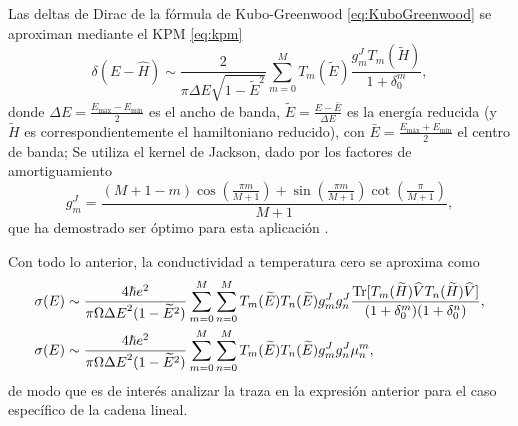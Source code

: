 Las deltas de Dirac de la fórmula de Kubo-Greenwood \eqref{eq:KuboGreenwood} se aproximan mediante el KPM \eqref{eq:kpm}
\begin{equation}\label{eq:diracDeltaKPM}
	\delta(E - \widehat{H}) \sim \frac{2}{\pi \Delta E \sqrt{1 - \widetilde{E}^2}} \sum_{m=0}^{M} T_m(\widetilde{E}) \frac{g^J_m T_m(\widetilde{H})}{1 + \delta^m_0},
\end{equation}
donde 
	$\Delta E = \frac{E_{\mathrm{máx}} - E_{\mathrm{mín}}}{2}$
es el ancho de banda, 
	$\widetilde{E} = \frac{E - \bar{E}}{\Delta E}$ 
es la energía reducida (y $\widetilde{H}$ es correspondientemente el hamiltoniano reducido), con $\bar{E} = \frac{E_{\mathrm{máx}} + E_{\mathrm{mín}}}{2}$ el centro de banda;
Se utiliza el kernel de Jackson, dado por los factores de amortiguamiento
\begin{equation}\label{eq:jacksonKernel}
	g_m^J = \frac{(M + 1 - m)\cos(\frac{\pi m}{M + 1}) + \sin(\frac{\pi m}{M + 1})\cot(\frac{\pi}{M + 1})}{M + 1},
\end{equation}
que ha demostrado ser óptimo para esta aplicación \autocite{Weise2006}.

Con todo lo anterior, la conductividad a temperatura cero se aproxima como
\begin{equation}\label{eq:KGapprox}
	\begin{aligned}
		\sigma(E) &\sim \frac{4\hbar e^2}{\pi\Omega{\Delta E}^2(1 - \widetilde{E}^2)} \sum_{m=0}^{M} \sum_{n=0}^{M} T_m(\widetilde{E})T_n(\widetilde{E}) g^J_m g^J_n \frac{\Trace[T_m(\widetilde{H})\widehat{V}T_n(\widetilde{H})\widehat{V}]}{(1 + \delta^m_0) (1 + \delta^n_0)}, \\ 
		\sigma(E) &\sim \frac{4\hbar e^2}{\pi\Omega{\Delta E}^2(1 - \widetilde{E}^2)} \sum_{m=0}^{M} \sum_{n=0}^{M} T_m(\widetilde{E})T_n(\widetilde{E}) g^J_m g^J_n \mu^m_n,
	\end{aligned}
\end{equation}
de modo que es de interés analizar la traza en la expresión anterior para el caso específico de la cadena lineal.

